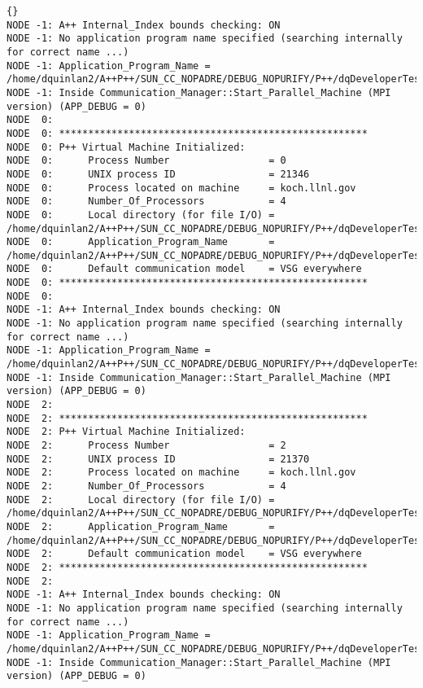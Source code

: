 \documentclass[10pt]{llncs}
\begin{document}
\vspace{0.5in}

\begin{lstlisting}{}
NODE -1: A++ Internal_Index bounds checking: ON 
NODE -1: No application program name specified (searching internally for correct name ...) 
NODE -1: Application_Program_Name = /home/dquinlan2/A++P++/SUN_CC_NOPADRE/DEBUG_NOPURIFY/P++/dqDeveloperTests/test2002_01 
NODE -1: Inside Communication_Manager::Start_Parallel_Machine (MPI version) (APP_DEBUG = 0) 
NODE  0: 
NODE  0: ***************************************************** 
NODE  0: P++ Virtual Machine Initialized: 
NODE  0:      Process Number                 = 0 
NODE  0:      UNIX process ID                = 21346 
NODE  0:      Process located on machine     = koch.llnl.gov 
NODE  0:      Number_Of_Processors           = 4 
NODE  0:      Local directory (for file I/O) = /home/dquinlan2/A++P++/SUN_CC_NOPADRE/DEBUG_NOPURIFY/P++/dqDeveloperTests  
NODE  0:      Application_Program_Name       = /home/dquinlan2/A++P++/SUN_CC_NOPADRE/DEBUG_NOPURIFY/P++/dqDeveloperTests/test2002_01 
NODE  0:      Default communication model    = VSG everywhere 
NODE  0: ***************************************************** 
NODE  0: 
NODE -1: A++ Internal_Index bounds checking: ON 
NODE -1: No application program name specified (searching internally for correct name ...) 
NODE -1: Application_Program_Name = /home/dquinlan2/A++P++/SUN_CC_NOPADRE/DEBUG_NOPURIFY/P++/dqDeveloperTests/test2002_01 
NODE -1: Inside Communication_Manager::Start_Parallel_Machine (MPI version) (APP_DEBUG = 0) 
NODE  2: 
NODE  2: ***************************************************** 
NODE  2: P++ Virtual Machine Initialized: 
NODE  2:      Process Number                 = 2 
NODE  2:      UNIX process ID                = 21370 
NODE  2:      Process located on machine     = koch.llnl.gov 
NODE  2:      Number_Of_Processors           = 4 
NODE  2:      Local directory (for file I/O) = /home/dquinlan2/A++P++/SUN_CC_NOPADRE/DEBUG_NOPURIFY/P++/dqDeveloperTests  
NODE  2:      Application_Program_Name       = /home/dquinlan2/A++P++/SUN_CC_NOPADRE/DEBUG_NOPURIFY/P++/dqDeveloperTests/test2002_01 
NODE  2:      Default communication model    = VSG everywhere 
NODE  2: ***************************************************** 
NODE  2: 
NODE -1: A++ Internal_Index bounds checking: ON 
NODE -1: No application program name specified (searching internally for correct name ...) 
NODE -1: Application_Program_Name = /home/dquinlan2/A++P++/SUN_CC_NOPADRE/DEBUG_NOPURIFY/P++/dqDeveloperTests/test2002_01 
NODE -1: Inside Communication_Manager::Start_Parallel_Machine (MPI version) (APP_DEBUG = 0) 

\end{lstlisting}
\end{document}
